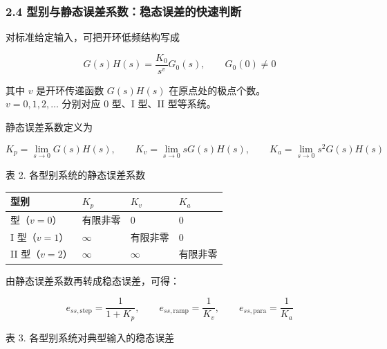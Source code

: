 \documentclass[
  11pt]{article}
\begin{document}
\subsubsection{2.4
型别与静态误差系数：稳态误差的快速判断}\label{ux578bux522bux4e0eux9759ux6001ux8befux5deeux7cfbux6570ux7a33ux6001ux8befux5deeux7684ux5febux901fux5224ux65ad}

对标准给定输入，可把开环低频结构写成

\begin{equation}
G(s)H(s)=\frac{K_0}{s^v}G_0(s), \qquad G_0(0)\neq 0
\tag{3-7-16}\label{eq:3-7-type-definition}
\end{equation}

其中 \(v\) 是开环传递函数 \(G(s)H(s)\) 在原点处的极点个数。\\
\(v=0,1,2,\dots\) 分别对应 0 型、I 型、II 型等系统。

静态误差系数定义为

\begin{equation}
K_p=\lim_{s\to 0}G(s)H(s), \qquad
K_v=\lim_{s\to 0}sG(s)H(s), \qquad
K_a=\lim_{s\to 0}s^2G(s)H(s)
\tag{3-7-17}\label{eq:3-7-static-coeff}
\end{equation}

\begin{center}
表 2. 各型别系统的静态误差系数
\end{center}

\begin{longtable}[]{@{}llll@{}}
\toprule\noalign{}
型别 & \(K_p\) & \(K_v\) & \(K_a\) \\
\midrule\noalign{}
\endhead
\bottomrule\noalign{}
\endlastfoot
0 型（\(v=0\)） & 有限非零 & 0 & 0 \\
I 型（\(v=1\)） & \(\infty\) & 有限非零 & 0 \\
II 型（\(v=2\)） & \(\infty\) & \(\infty\) & 有限非零 \\
\end{longtable}

由静态误差系数再转成稳态误差，可得：

\begin{equation}
e_{ss,\mathrm{step}}=\frac{1}{1+K_p}, \qquad
e_{ss,\mathrm{ramp}}=\frac{1}{K_v}, \qquad
e_{ss,\mathrm{para}}=\frac{1}{K_a}
\tag{3-7-18}\label{eq:3-7-standard-ess}
\end{equation}

\begin{center}
表 3. 各型别系统对典型输入的稳态误差
\end{center}
\end{document}
